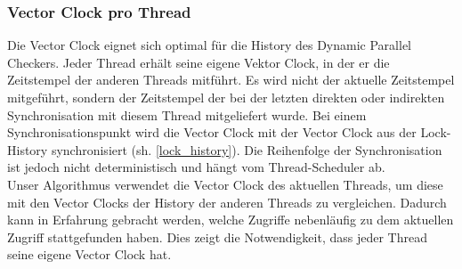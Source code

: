 \documentclass[10pt,a4paper]{article}
\begin{document}
\subsubsection{Vector Clock pro Thread}
\begin{flushleft}
Die Vector Clock eignet sich optimal für die History des Dynamic Parallel Checkers. Jeder Thread erhält seine eigene Vektor Clock, in der er die Zeitstempel der anderen Threads mitführt. Es wird nicht der aktuelle Zeitstempel mitgeführt, sondern der Zeitstempel der bei der letzten direkten oder indirekten Synchronisation mit diesem Thread mitgeliefert wurde. Bei einem Synchronisationspunkt wird die Vector Clock mit der Vector Clock aus der Lock-History synchronisiert (sh. \ref{lock_history}). Die Reihenfolge der Synchronisation ist jedoch nicht deterministisch und hängt vom Thread-Scheduler ab.\\
Unser Algorithmus verwendet die Vector Clock des aktuellen Threads, um diese mit den Vector Clocks der History der anderen Threads zu vergleichen. Dadurch kann in Erfahrung gebracht werden, welche Zugriffe nebenläufig zu dem aktuellen Zugriff stattgefunden haben. Dies zeigt die Notwendigkeit, dass jeder Thread seine eigene Vector Clock hat.
\end{flushleft}
\end{document}
